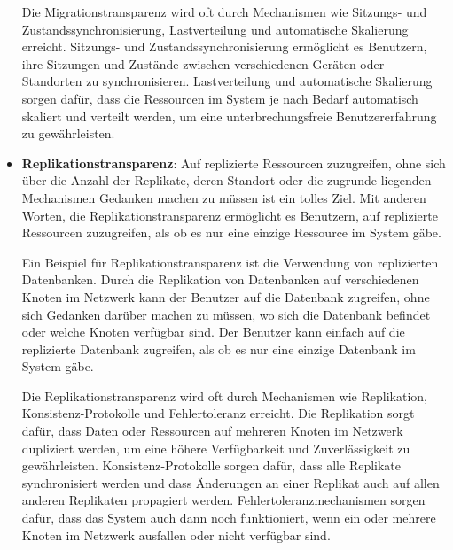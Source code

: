 \begin{itemize}
Die Migrationstransparenz wird oft durch Mechanismen wie Sitzungs- und Zustandssynchronisierung, Lastverteilung und automatische Skalierung erreicht. Sitzungs- und Zustandssynchronisierung ermöglicht es Benutzern, ihre Sitzungen und Zustände zwischen verschiedenen Geräten oder Standorten zu synchronisieren. Lastverteilung und automatische Skalierung sorgen dafür, dass die Ressourcen im System je nach Bedarf automatisch skaliert und verteilt werden, um eine unterbrechungsfreie Benutzererfahrung zu gewährleisten.

\item \textbf{Replikationstransparenz}:  Auf replizierte Ressourcen zuzugreifen, ohne sich über die Anzahl der Replikate, deren Standort oder die zugrunde liegenden Mechanismen Gedanken machen zu müssen ist ein tolles Ziel. Mit anderen Worten, die Replikationstransparenz ermöglicht es Benutzern, auf replizierte Ressourcen zuzugreifen, als ob es nur eine einzige Ressource im System gäbe.

Ein Beispiel für Replikationstransparenz ist die Verwendung von replizierten Datenbanken. Durch die Replikation von Datenbanken auf verschiedenen Knoten im Netzwerk kann der Benutzer auf die Datenbank zugreifen, ohne sich Gedanken darüber machen zu müssen, wo sich die Datenbank befindet oder welche Knoten verfügbar sind. Der Benutzer kann einfach auf die replizierte Datenbank zugreifen, als ob es nur eine einzige Datenbank im System gäbe.


Die Replikationstransparenz wird oft durch Mechanismen wie Replikation, Konsistenz-Protokolle und Fehlertoleranz erreicht. Die Replikation sorgt dafür, dass Daten oder Ressourcen auf mehreren Knoten im Netzwerk dupliziert werden, um eine höhere Verfügbarkeit und Zuverlässigkeit zu gewährleisten. Konsistenz-Protokolle sorgen dafür, dass alle Replikate synchronisiert werden und dass Änderungen an einer Replikat auch auf allen anderen Replikaten propagiert werden. Fehlertoleranzmechanismen sorgen dafür, dass das System auch dann noch funktioniert, wenn ein oder mehrere Knoten im Netzwerk ausfallen oder nicht verfügbar sind.


\end{itemize}
